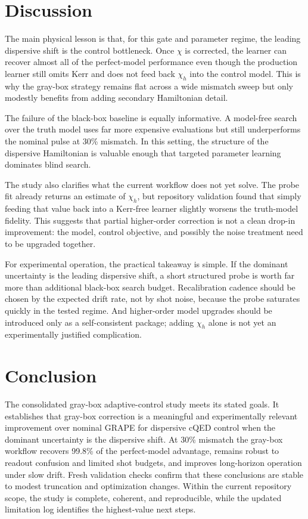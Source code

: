\documentclass[aps,pra,twocolumn,reprint,amsmath,amssymb]{revtex4-2}
\begin{document}
\section{Discussion}

The main physical lesson is that, for this gate and parameter regime, the leading dispersive
shift is the control bottleneck. Once $\chi$ is corrected, the learner can recover almost all
of the perfect-model performance even though the production learner still omits Kerr and does
not feed back $\chi_h$ into the control model. This is why the gray-box strategy remains flat
across a wide mismatch sweep but only modestly benefits from adding secondary Hamiltonian
detail.

The failure of the black-box baseline is equally informative. A model-free search over the
truth model uses far more expensive evaluations but still underperforms the nominal pulse at
30\% mismatch. In this setting, the structure of the dispersive Hamiltonian is valuable enough
that targeted parameter learning dominates blind search.

The study also clarifies what the current workflow does not yet solve. The probe fit already
returns an estimate of $\chi_h$, but repository validation found that simply feeding that value
back into a Kerr-free learner slightly worsens the truth-model fidelity. This suggests that
partial higher-order correction is not a clean drop-in improvement: the model, control
objective, and possibly the noise treatment need to be upgraded together.

For experimental operation, the practical takeaway is simple. If the dominant uncertainty is the leading dispersive shift, a short structured probe is worth far more than additional black-box search budget. Recalibration cadence should be chosen by the expected drift rate, not by shot noise, because the probe saturates quickly in the tested regime. And higher-order model upgrades should be introduced only as a self-consistent package; adding $\chi_h$ alone is not yet an experimentally justified complication.

\section{Conclusion}

The consolidated gray-box adaptive-control study meets its stated goals. It establishes that
gray-box correction is a meaningful and experimentally relevant improvement over nominal GRAPE
for dispersive cQED control when the dominant uncertainty is the dispersive shift. At 30\%
mismatch the gray-box workflow recovers 99.8\% of the perfect-model advantage, remains robust
to readout confusion and limited shot budgets, and improves long-horizon operation under slow
drift. Fresh validation checks confirm that these conclusions are stable to modest truncation
and optimization changes. Within the current repository scope, the study is complete, coherent,
and reproducible, while the updated limitation log identifies the highest-value next steps.
\end{document}
